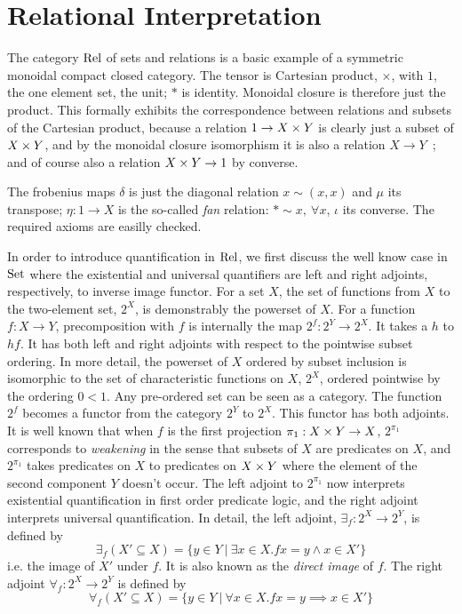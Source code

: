 \section{Relational Interpretation}


The category $\mathrm{Rel}$ of sets and relations is a basic example of a
symmetric monoidal compact closed category. The tensor is Cartesian
product, $\times$, with $1$, the one element set, the unit; $*$ is
identity. Monoidal closure is therefore just the product. This
formally exhibits the correspondence between relations and subsets of
the Cartesian product, because a relation $ 1 \to X \times Y $ is clearly
just a subset of $X \times Y$, and by the monoidal closure isomorphism it
is also a relation $ X \to Y $~; and of course also a relation $X \times Y
\to 1$ by converse.


The frobenius maps $\delta$ is just 
the diagonal relation $x \sim (x,x)$ and $\mu$ its transpose; $\eta : 1
\to X$ is the so-called \emph{fan} relation: $\ast \sim x, ~  \forall
x$, $\iota$ its converse. The required axioms are easilly checked. 


In order to introduce quantification in $\mathrm{Rel}$, we first discuss the
well know case in $\mathrm{Set}$ where the existential and universal
quantifiers are left and right adjoints, respectively, to inverse
image functor.
%
For a set $X$, the set of functions from $X$ to the two-element set,
$2^X$, is demonstrably the powerset of $X$.  For a function $f : X \to
Y$, precomposition with $f$ is internally the map $2^f : 2^Y \to
2^X$. It takes a $h$ to $hf$.  It has both left and right adjoints
with respect to the pointwise subset ordering. In more detail, the
powerset of $X$ ordered by subset inclusion is isomorphic to the set
of characteristic functions on $X$, $2^X$, ordered pointwise by the
ordering $0 < 1$.  Any pre-ordered set can be seen as a category. The
function $2^f$ becomes a functor from the category $2^Y$ to
$2^X$. This functor has both adjoints. It is well known that when $f$
is the first projection $\pi_1 : X\times Y \to X$, $2^{\pi_1}$ corresponds
to \emph{weakening} in the sense that subsets of $X$ are predicates on
$X$, and $2^{\pi_1}$ takes predicates on $X$ to predicates on $X\times Y$
where the element of the second component $Y$ doesn't occur.  The left
adjoint to $2^{\pi_1}$ now interprets existential quantification in first
order predicate logic, and the right adjoint interprets universal
quantification. In detail, 
the left adjoint, $\exists_f : 2^X \to 2^Y$, is defined by 
\[\exists_f (X' \subseteq X) = \{ y \in Y ~|~ \exists x \in X. f x = y
\wedge x \in X'\} \]
i.e. the image of $X'$ under $f$. It is also known as the
\emph{direct image} of $f$.
The right adjoint $\forall_f : 2^X
\to 2^Y$ is defined by 
%
\[
\forall_f (X' \subseteq X) = \{ y \in Y ~|~ \forall x \in X. f x = y
\implies x \in X' \} \] 
%


